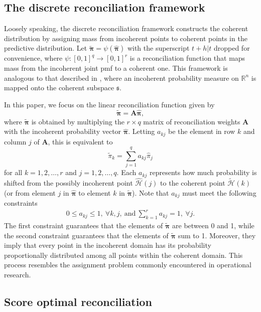 \documentclass[a4paper,review,12pt,authoryear]{elsarticle}
\newcommand{\bpi}{\bm{\pi}}
\theoremstyle{definition}
\begin{document}
    \subsection{The discrete reconciliation framework}

    Loosely speaking, the discrete reconciliation framework constructs the coherent distribution by assigning mass from incoherent points to coherent points in the predictive distribution.
    Let $\tilde{\bpi} = \psi(\hat{\bpi})$ with the superscript $t+h|t$ dropped for convenience, where $\psi:[0,1]^q \rightarrow [0,1]^r$ is a reconciliation function that maps mass from the incoherent joint pmf to a coherent one.
    This framework is analogous to that described in \cite{panagiotelisProbabilisticForecastReconciliation2022}, where an incoherent probability measure on $\mathbb{R}^n$ is mapped onto the coherent subspace $\mathfrak{s}$.

    In this paper, we focus on the linear reconciliation function given by
    \begin{equation}
      \label{eq:framework}
    \tilde{\bpi}=\bm{A}\hat{\bpi},
    \end{equation}
    where $\tilde{\bpi}$ is obtained by multiplying the $r \times q$ matrix of reconciliation weights $\bm{A}$ with the incoherent probability vector $\hat{\bpi}$. Letting $a_{kj}$ be the element in row $k$ and column $j$ of $\bm{A}$, this is equivalent to
    \[
      \tilde{\pi}_k=\sum\limits_{j=1}^q a_{kj}\hat{{\pi}}_j
    \]
    for all $k = 1, 2, \dots, r$  and  $j = 1, 2, \dots, q$.
    Each $a_{kj}$ represents how much probability is shifted from the possibly incoherent point $\hat{\mathcal{H}}(j)$ to the coherent point $\tilde{\mathcal{H}}(k)$ (or from element $j$ in $\hat{\bpi}$ to element $k$ in $\tilde{\bpi}$). Note that $a_{kj}$ must meet the following constraints
    \begin{align*}
    0\leq a_{kj} \leq 1 , ~ \forall k, j, ~ \textrm{and} ~
    \sum\limits_{k=1}^r a_{kj} = 1 , ~ \forall j.
    \end{align*}
    The first constraint guarantees that the elements of $\tilde{\bpi}$ are between 0 and 1, while the second constraint guarantees that the elements of $\tilde{\bpi}$ sum to 1.
    Moreover, they imply that every point in the incoherent domain has its probability proportionally distributed among all points  within the coherent domain.
    This process resembles the assignment problem commonly encountered in operational research.

    \subsection{Score optimal reconciliation}
    \label{sec:algorithm}
\end{document}
